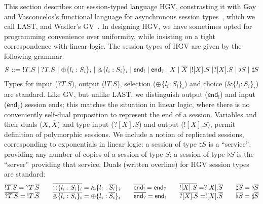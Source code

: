 \documentclass{easychair}
\makeatletter
\newcommand{\ba}{\begin{array}}
\newcommand{\ea}{\end{array}}
\newcommand{\bl}{\ba{@{}c@{}}}
\newcommand{\el}{\ea}
\newenvironment{equations}{\[\ba{@{}r@{~}c@{~}l@{}}}{\ea\]}
\newcommand{\key}{\mathsf}
\newcommand{\set}[1]{\{ #1 \}}
\newcommand{\row}[2]{\set{#1}_{#2}}
\newcommand{\gvOutput}[2]{\mathord{!}{#1}.{#2}}
\newcommand{\gvInput}[2]{\mathord{?}{#1}.{#2}}
\newcommand{\gvEndOutput}{\key{end}_!}
\newcommand{\gvEndInput}{\key{end}_?}
\newcommand{\gvPlus}[2]{\oplus \row{#1}{#2}}
\newcommand{\gvChoice}[2]{\binampersand \row{#1}{#2}}
\newcommand{\gvServer}[1]{\flat {#1}}
\newcommand{\gvService}[1]{\sharp {#1}}
\newcommand{\gvDual}[1]{\overline{#1}}
\newcommand{\gvOutputType}[2]{![{#1}].{#2}}
\newcommand{\gvInputType}[2]{?[{#1}].{#2}}
\newcommand{\la}{l}
\newcommand{\last}{LAST\xspace}
\newcommand{\hgv}{HGV\xspace}
\makeatother
\begin{document}
This section describes our session-typed language \hgv, constrasting it with Gay and Vasconcelos's
functional language for asynchronous session types~\cite{GayVasconcelos10}, which we call \last, and
Wadler's GV~\cite{Wadler12}. 
In designing \hgv, we have sometimes opted for programming convenience over uniformity, while
insisting on a tight correspondence with linear logic.
%
The session types of \hgv are given by the following grammar.
\begin{equations}
  S & ::= & \gvOutput{T}{S} \mid \gvInput{T}{S} \mid
           \gvPlus{\la_i:S_i}{i} \mid \gvChoice{\la_i:S_i}{i} \mid
           \gvEndOutput \mid \gvEndInput
    \mid X \mid \gvDual{X} \mid
            \gvOutputType{X}{S} \mid \gvInputType{X}{S} \mid
            \gvServer{S} \mid \gvService{S}
\end{equations}%
Types for input ($\gvInput{T}{S}$), output ($\gvOutput{T}{S}$), selection ($\gvPlus{\la_i:S_i}{i}$)
and choice ($\gvChoice{\la_i:S_i}{i}$) are standard. Like GV, but unlike \last, we distinguish
output ($\gvEndOutput$) and input ($\gvEndInput$) session ends; this matches the situation in linear
logic, where there is no conveniently self-dual proposition to represent the end of a
session. Variables and their duals ($X,\gvDual{X}$) and type input ($\gvInputType{X}{S}$) and
output ($\gvOutputType{X}{S}$), permit definition of polymorphic sessions. We include a notion of
replicated sessions, corresponding to exponentials in linear logic: a session of type
$\gvService{S}$ is a ``service'', providing any number of copies of a session of type $S$; a session
of type $\gvServer{S}$ is the ``server'' providing that service.
%
Duals (written overline) for \hgv session types are standard:
\[
\bl
  \gvDual{\gvOutput{T}{S}} = \gvInput{T}{\gvDual{S}}
\qquad
  \gvDual{\gvPlus{\la_i:S_i}{i}} = \gvChoice{\la_i:\gvDual{S_i}}{i}
\qquad
  \gvDual{\gvEndOutput} = \gvEndInput
\qquad
  \gvDual{\gvOutputType{X}{S}} = \gvInputType{X}{\gvDual{S}}
\qquad
  \gvDual{\gvService{S}} = \gvServer{\gvDual{S}}
\\
  \gvDual{\gvInput{T}{S}} = \gvOutput{T}{\gvDual{S}}
\qquad
  \gvDual{\gvChoice{\la_i:S_i}{i}} = \gvPlus{\la_i:\gvDual{S_i}}{i}
\qquad
  \gvDual{\gvEndInput} = \gvEndOutput
\qquad
  \gvDual{\gvInputType{X}{S}} = \gvOutputType{X}{\gvDual{S}}
\qquad
  \gvDual{\gvServer{S}} = \gvService{\gvDual{S}}
\\
\el
\]
\end{document}
